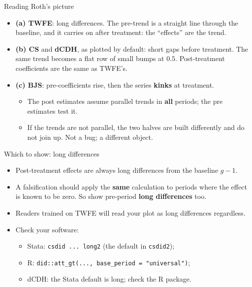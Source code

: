 \documentclass[
  11pt,
  ignorenonframetext,
  aspectratio=169,
]{beamer}
\providecommand{\tightlist}{%
  \setlength{\itemsep}{0pt}\setlength{\parskip}{0pt}}
\begin{document}
\begin{frame}{Reading Roth's picture}
\protect{}\label{reading-roths-picture}
\begin{itemize}
\tightlist
\item
  \textbf{(a) TWFE}: long differences. The pre-trend is a straight line
  through the baseline, and it carries on after treatment: the
  ``effects'' are the trend.
\item
  \textbf{(b) CS} and \textbf{dCDH}, as plotted by default: short gaps
  before treatment. The same trend becomes a flat row of small bumps at
  \(0.5\). Post-treatment coefficients are the same as TWFE's.
\item
  \textbf{(c) BJS}: pre-coefficients rise, then the series
  \textbf{kinks} at treatment.

  \begin{itemize}
  \tightlist
  \item
    The post estimates assume parallel trends in \textbf{all} periods;
    the pre estimates test it.
  \item
    If the trends are not parallel, the two halves are built differently
    and do not join up. Not a bug; a different object.
  \end{itemize}
\end{itemize}
\end{frame}

\begin{frame}[fragile]{Which to show: long differences}
\protect{}\label{which-to-show-long-differences}
\begin{itemize}
\tightlist
\item
  Post-treatment effects are always long differences from the baseline
  \(g - 1\).
\item
  A falsification should apply the \textbf{same} calculation to periods
  where the effect is known to be zero. So show pre-period \textbf{long
  differences} too.
\item
  Readers trained on TWFE will read your plot as long differences
  regardless.
\end{itemize}

\vspace{0.4em}

\begin{itemize}
\tightlist
\item
  Check your software:

  \begin{itemize}
  \tightlist
  \item
    Stata: \texttt{csdid\ ...\ long2} (the default in \texttt{csdid2});
  \item
    R: \texttt{did::att\_gt(...,\ base\_period\ =\ "universal")};
  \item
    dCDH: the Stata default is long; check the R package.
  \end{itemize}
\end{itemize}
\end{frame}
\end{document}
